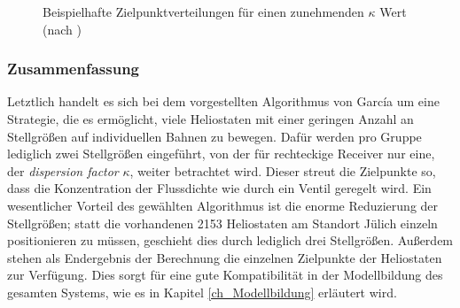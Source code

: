 \begin{figure}[h!]
    \centering
    \setlength{\fboxsep}{1pt}
    \setlength{\fboxrule}{1pt}
    \caption[Beispielhafte Zielpunktverteilungen für einen zunehmenden $\kappa$ Wert]{Beispielhafte Zielpunktverteilungen für einen zunehmenden $\kappa$ Wert (nach \mbox{\cite[S.11]{Garcia2}})}
    \label{fig_GarciaZielpunkte}
\end{figure}

\subsubsection*{Zusammenfassung} \label{subsubsec_Zusammenfassung}
Letztlich handelt es sich bei dem vorgestellten Algorithmus von García um eine Strategie, die es ermöglicht, viele Heliostaten mit einer geringen Anzahl an Stellgrößen auf individuellen Bahnen zu bewegen.
Dafür werden pro Gruppe lediglich zwei Stellgrößen eingeführt, von der für rechteckige Receiver nur eine, der \textit{dispersion factor} $\kappa$, weiter betrachtet wird.
Dieser streut die Zielpunkte so, dass die Konzentration der Flussdichte wie durch ein Ventil geregelt wird.
Ein wesentlicher Vorteil des gewählten Algorithmus ist die enorme Reduzierung der Stellgrößen; statt die vorhandenen 2153 Heliostaten am Standort Jülich einzeln positionieren zu müssen, geschieht dies durch lediglich drei Stellgrößen.
Außerdem stehen als Endergebnis der Berechnung die einzelnen Zielpunkte der Heliostaten zur Verfügung.
Dies sorgt für eine gute Kompatibilität in der Modellbildung des gesamten Systems, wie es in Kapitel \ref{ch_Modellbildung} erläutert wird.


